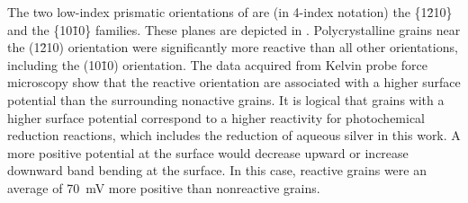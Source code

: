 The two low-index prismatic orientations  of  are (in 4-index notation) the
\{1\={2}10\} and the \{10\={1}0\} families. These planes are depicted in
. Polycrystalline grains near the (1\={2}10) orientation were
significantly more reactive than all other orientations, including the (10\={1}0)
orientation. The data acquired from Kelvin probe force microscopy show that the reactive
orientation are associated with a higher surface potential than the surrounding nonactive
grains. It is logical that grains with a higher surface potential correspond to a higher
reactivity for photochemical reduction reactions, which includes the reduction of aqueous
silver in this work. A more positive potential at the surface would decrease upward or
increase downward band bending at the surface. In this case, reactive grains were an
average of \SI{70}{\milli\volt} more positive than nonreactive grains. 

